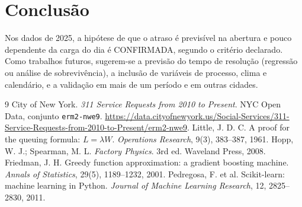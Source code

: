 \documentclass[11pt,a4paper]{article}
\begin{document}
\section{Conclusão}
Nos dados de 2025, a hipótese de que o atraso é previsível na abertura e pouco dependente da carga do dia é CONFIRMADA, segundo o critério declarado. Como trabalhos futuros, sugerem-se a previsão do tempo de resolução (regressão ou análise de sobrevivência), a inclusão de variáveis de processo, clima e calendário, e a validação em mais de um período e em outras cidades.

\begin{thebibliography}{9}
 City of New York. \textit{311 Service Requests from 2010 to Present}. NYC Open Data, conjunto \texttt{erm2-nwe9}. \url{https://data.cityofnewyork.us/Social-Services/311-Service-Requests-from-2010-to-Present/erm2-nwe9}.
 Little, J. D. C. A proof for the queuing formula: $L = \lambda W$. \textit{Operations Research}, 9(3), 383--387, 1961.
 Hopp, W. J.; Spearman, M. L. \textit{Factory Physics}. 3rd ed. Waveland Press, 2008.
 Friedman, J. H. Greedy function approximation: a gradient boosting machine. \textit{Annals of Statistics}, 29(5), 1189--1232, 2001.
 Pedregosa, F. et al. Scikit-learn: machine learning in Python. \textit{Journal of Machine Learning Research}, 12, 2825--2830, 2011.
\end{thebibliography}
\end{document}
